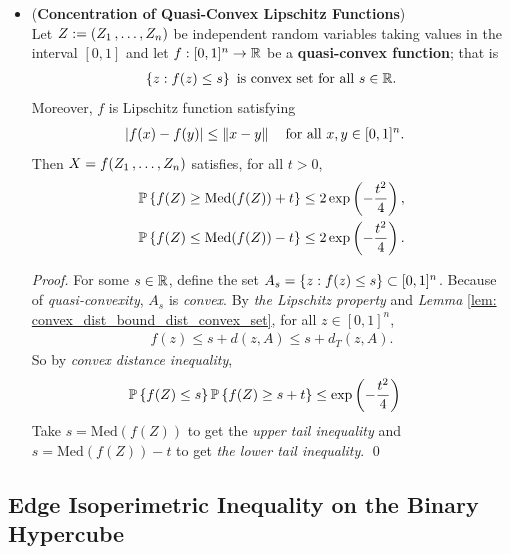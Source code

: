 \documentclass[11pt]{article}
\begin{document}
\begin{itemize}
\item \begin{theorem} (\textbf{Concentration of Quasi-Convex Lipschitz Functions}) \citep{boucheron2013concentration}\\
Let  $Z:= (Z_1 \,{,}\ldots{,}\, Z_{n})$ be independent random variables taking values in the interval $[0, 1]$ and let $f : [0, 1]^n \to {\mathbb R}$ be a \textbf{quasi-convex function}; that is
\begin{align*}
\left\{z: f(z) \le s\right\} \text{ is convex set for all }s \in {\mathbb R}. 
\end{align*} Moreover, $f$ is Lipschitz function satisfying
\begin{align*}
\left\lvert f(x) - f(y) \right\rvert &\le \left\|x - y\right\|_{} \quad \text{for all }x, y \in [0, 1]^n.
\end{align*}
Then $X = f(Z_1 \,{,}\ldots{,}\, Z_{n})$ satisfies, for all $t > 0$,
\begin{align}
{\mathbb P}\left\{f(Z)  \ge  \text{Med}(f(Z)) + t \right\} &\le 2\exp\left(- \frac{t^2}{4}\right), \label{ineqn: convex_lipschitz_concentration_med} \\
{\mathbb P}\left\{f(Z)  \le \text{Med}(f(Z)) -t \right\} &\le 2\exp\left(- \frac{t^2}{4}\right). \nonumber
\end{align}
\end{theorem}
\begin{proof}
For some $s \in {\mathbb R}$, define the set $A_s = \left\{z : f(z) \le s\right\} \subset [0, 1]^n$.  Because of \emph{quasi-convexity}, $A_s$ is \emph{convex}.  By \emph{the Lipschitz property} and \emph{Lemma} \ref{lem: convex_dist_bound_dist_convex_set}, for all $z \in [0, 1]^n$,
\begin{align*}
f(z) \le s +  d(z, A) \le s + d_{T}(z, A).
\end{align*} So by \emph{convex distance inequality}, 
\begin{align*}
{\mathbb P}\left\{f(Z) \le s\right\} {\mathbb P}\left\{f(Z) \ge s + t\right\} &\le \exp\left(- \frac{t^2}{4}\right)
\end{align*} Take $s = \text{Med}(f(Z))$ to get the \emph{upper tail inequality} and $s = \text{Med}(f(Z)) - t$ to get \emph{the lower tail inequality}. \qed
\end{proof}
\end{itemize}

\subsection{Edge Isoperimetric Inequality on the Binary Hypercube}
\end{document}
